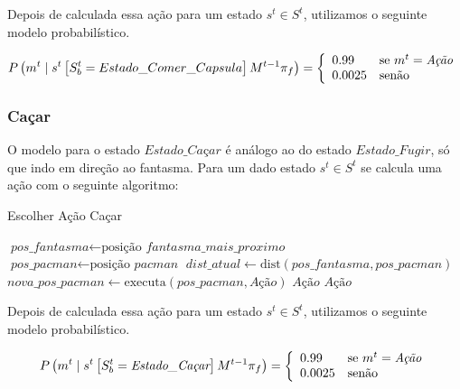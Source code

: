 Depois de calculada essa ação para um estado $ s^t \in S^t $, utilizamos o seguinte modelo probabilístico.

\begin{equation}
    P \left( m^t \mid s^t \left[ S_b^t = Estado\_Comer\_Capsula \right] M^{t-1} \pi_f \right) = 
        \left\{
            \begin{array}{l l}
                0.99 & \text{se }m^t = \textit{Ação} \\
                0.0025 & \text{senão}
            \end{array}
        \right.
\end{equation}


\subsubsection*{Caçar}

O modelo para o estado $ \textit{Estado\_Caçar} $ é análogo ao do estado $ Estado\_Fugir $, só que indo em direção ao fantasma. Para um dado estado $ s^t \in S^t $ se calcula uma ação com o seguinte algoritmo:

\begin{algorithm}[H]
	\caption{Escolher Ação Caçar} \label{algorithm:SelecaoDeAcaoCaçar}
	\begin{algorithmic}[1]
			\State $\textit{pos\_fantasma} \gets \text{posição }\textit{fantasma\_mais\_proximo} $
			\State $\textit{pos\_pacman} \gets \text{posição }\textit{pacman} $
			\State $\textit{dist\_atual} \gets \text{dist} \left( \textit{pos\_fantasma}, \textit{pos\_pacman} \right) $
				\State $\textit{nova\_pos\_pacman} \gets \text{executa} \left( \textit{pos\_pacman}, \textit{Ação} \right) $
					\State \Return $ \textit{Ação} $
				\EndIf 
			\EndFor
			\State \Return $ \textit{Ação} $
		\EndProcedure
	\end{algorithmic}
\end{algorithm}

Depois de calculada essa ação para um estado $ s^t \in S^t $, utilizamos o seguinte modelo probabilístico.

\begin{equation}
    P \left( m^t \mid s^t \left[ S_b^t = \textit{Estado\_Caçar} \right] M^{t-1} \pi_f \right) = 
        \left\{
            \begin{array}{l l}
                0.99 & \text{se }m^t = \textit{Ação} \\
                0.0025 & \text{senão}
            \end{array}
        \right.
\end{equation}

